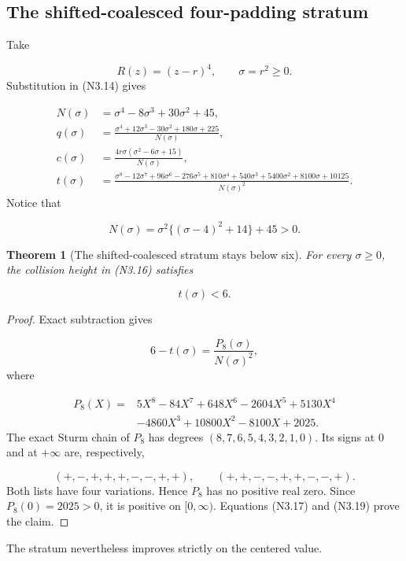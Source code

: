 \documentclass[11pt]{article}
\newtheorem{theorem}{Theorem}[section]
\theoremstyle{definition}
\theoremstyle{remark}
\begin{document}
\subsection{The shifted-coalesced four-padding stratum}

Take

\[
 R(z)=(z-r)^4,
 \qquad \sigma=r^2\ge0.
 \tag{N3.15}
\]
Substitution in \textup{(N3.14)} gives

\[
\begin{aligned}
N(\sigma)&=\sigma^4-8\sigma^3+30\sigma^2+45,\\
q(\sigma)&=\frac{\sigma^4+12\sigma^3-30\sigma^2+180\sigma+225}
                  {N(\sigma)},\\
c(\sigma)&=\frac{4r\sigma(\sigma^2-6\sigma+15)}{N(\sigma)},\\
t(\sigma)&=\frac{\sigma^8-12\sigma^7+96\sigma^6-276\sigma^5
 +810\sigma^4+540\sigma^3+5400\sigma^2+8100\sigma+10125}
 {N(\sigma)^2}.
\end{aligned}
\tag{N3.16}
\]
Notice that

\[
 N(\sigma)=\sigma^2\{(\sigma-4)^2+14\}+45>0.
 \tag{N3.17}
\]

\begin{theorem}[The shifted-coalesced stratum stays below six]
\label{thm:f2v3-coalesced}
For every \(\sigma\ge0\), the collision height in \textup{(N3.16)}
satisfies

\[
 \boxed{t(\sigma)<6.}
 \tag{N3.18}
\]
\end{theorem}

\begin{proof}
Exact subtraction gives

\[
 6-t(\sigma)=\frac{P_8(\sigma)}{N(\sigma)^2},
 \tag{N3.19}
\]
where

\[
\begin{aligned}
P_8(X)={}&5X^8-84X^7+648X^6-2604X^5+5130X^4\\
&-4860X^3+10800X^2-8100X+2025.
\end{aligned}
\tag{N3.20}
\]
The exact Sturm chain of \(P_8\) has degrees
\((8,7,6,5,4,3,2,1,0)\).  Its signs at \(0\) and at \(+\infty\) are,
respectively,

\[
 (+,-,+,+,+,-,-,+,+),
 \qquad
 (+,+,-,-,+,+,-,-,+).
 \tag{N3.21}
\]
Both lists have four variations.  Hence \(P_8\) has no positive real
zero.  Since \(P_8(0)=2025>0\), it is positive on
\([0,\infty)\).  Equations \textup{(N3.17)} and \textup{(N3.19)} prove
the claim.
\end{proof}

The stratum nevertheless improves strictly on the centered value.
\end{document}
